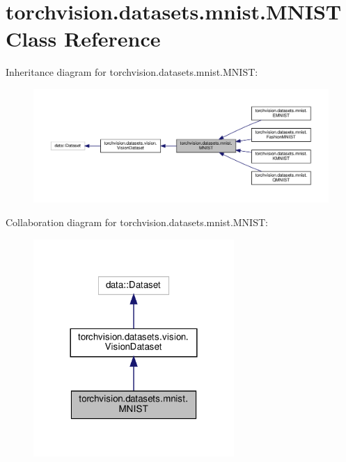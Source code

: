 \hypertarget{classtorchvision_1_1datasets_1_1mnist_1_1MNIST}{}\section{torchvision.\+datasets.\+mnist.\+M\+N\+I\+ST Class Reference}
\label{classtorchvision_1_1datasets_1_1mnist_1_1MNIST}


Inheritance diagram for torchvision.\+datasets.\+mnist.\+M\+N\+I\+ST\+:
\nopagebreak
\begin{figure}[H]
\begin{center}
\leavevmode
\includegraphics[width=350pt]{classtorchvision_1_1datasets_1_1mnist_1_1MNIST__inherit__graph}
\end{center}
\end{figure}


Collaboration diagram for torchvision.\+datasets.\+mnist.\+M\+N\+I\+ST\+:
\nopagebreak
\begin{figure}[H]
\begin{center}
\leavevmode
\includegraphics[width=216pt]{classtorchvision_1_1datasets_1_1mnist_1_1MNIST__coll__graph}
\end{center}
\end{figure}
